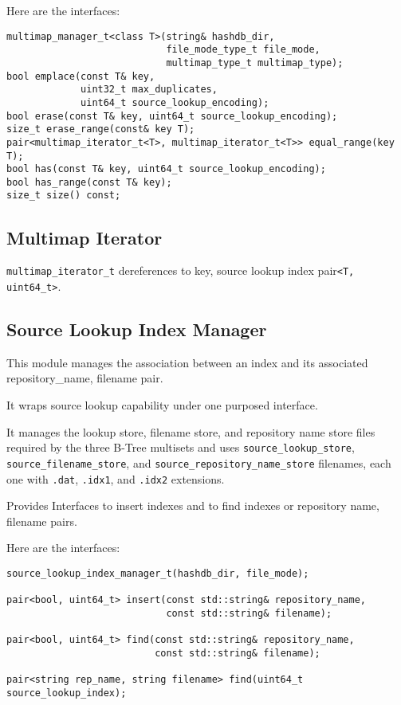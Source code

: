 \documentclass[12pt,twoside]{article}
\begin{document}
Here are the interfaces:
\begin{small}
\begin{verbatim}
multimap_manager_t<class T>(string& hashdb_dir,
                            file_mode_type_t file_mode,
                            multimap_type_t multimap_type);
bool emplace(const T& key,
             uint32_t max_duplicates,
             uint64_t source_lookup_encoding);
bool erase(const T& key, uint64_t source_lookup_encoding);
size_t erase_range(const& key T);
pair<multimap_iterator_t<T>, multimap_iterator_t<T>> equal_range(key T);
bool has(const T& key, uint64_t source_lookup_encoding);
bool has_range(const T& key);
size_t size() const;
\end{verbatim}
\end{small}

\subsection{Multimap Iterator}
\texttt{multimap\_iterator\_t} dereferences to
key, source lookup index pair\texttt{<T, uint64\_t>}.

\subsection{Source Lookup Index Manager}
This module manages the association between an index
and its associated repository\_name, filename pair.
\begin{compactitem}
\item It wraps source lookup capability under one purposed interface.
\item It manages the lookup store, filename store,
and repository name store files required by the three B-Tree multisets
and uses
\texttt{source\_lookup\_store},
\texttt{source\_filename\_store}, and
\texttt{source\_repository\_name\_store}
filenames, each one with
\texttt{.dat}, \texttt{.idx1}, and \texttt{.idx2} extensions.
\item Provides Interfaces to insert indexes
and to find indexes or repository name, filename pairs.
\end{compactitem}

Here are the interfaces:

\begin{small}
\begin{verbatim}
source_lookup_index_manager_t(hashdb_dir, file_mode);

pair<bool, uint64_t> insert(const std::string& repository_name,
                            const std::string& filename);

pair<bool, uint64_t> find(const std::string& repository_name,
                          const std::string& filename);

pair<string rep_name, string filename> find(uint64_t source_lookup_index);
\end{verbatim}
\end{small}
\end{document}
